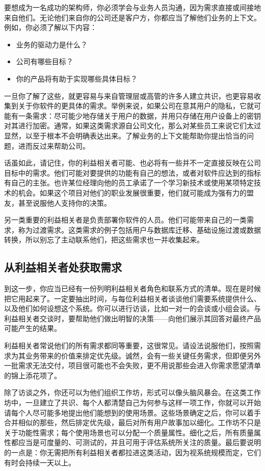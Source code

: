 \label{idx:167}
要想成为一名成功的架构师，你必须学会与业务人员沟通，因为需求直接或间接地来自他们。无论他们来自你的公司还是客户方，你都应当了解他们业务的上下文。例如，你必须了解以下内容：

\begin{itemize}
\item 业务的驱动力是什么？
\item 公司有哪些目标？
\item 你的产品将有助于实现哪些具体目标？
\end{itemize}

一旦你了解了这些，就更容易与来自管理层或高管的许多人建立共识，也更容易收集到关于你软件的更具体的需求。举例来说，如果公司在意其用户的隐私，它就可能有一条需求：尽可能少地存储关于用户的数据，并用只存储在用户设备上的密钥对其进行加密。通常，如果这类需求源自公司文化，那么对某些员工来说它们太过显然，以至于根本不会明确表达出来。了解业务的上下文能帮助你提出恰当的问题，进而反过来帮助公司。

话虽如此，请记住，你的利益相关者可能、也必将有一些并不一定直接反映在公司目标中的需求。他们可能对要提供的功能有自己的想法，或者对软件应达到的指标有自己的主张。也许某位经理向他的员工承诺了一个学习新技术或使用某项特定技术的机会。如果这个项目对他们的职业发展很重要，他们就可能成为强有力的盟友，甚至说服他人支持你的决策。

另一类重要的利益相关者是负责部署你软件的人员。他们可能带来自己的一类需求，称为过渡需求。这类需求的例子包括用户与数据库迁移、基础设施过渡或数据转换，所以别忘了主动联系他们，把这些需求也一并收集起来。

\subsection{从利益相关者处获取需求}

\label{idx:168}
到这一步，你应当已经有一份列明利益相关者角色和联系方式的清单。现在是时候把它用起来了。一定要抽出时间，与每位利益相关者谈谈他们需要系统提供什么、以及他们如何设想这个系统。你可以进行访谈，比如一对一的会谈或小组会谈。与利益相关者交谈时，要帮助他们做出明智的决策——向他们展示其回答对最终产品可能产生的结果。

利益相关者常说他们的所有需求都同等重要，这很常见。请设法说服他们，按照需求为其业务带来的价值来排定优先级。诚然，会有一些关键任务需求，但即便另外一批需求无法交付，项目很可能也不会失败，更不用说那些会进入你需求愿望清单的锦上添花项了。

\label{idx:169}
除了访谈之外，你还可以为他们组织工作坊，形式可以像头脑风暴会。在这类工作坊中，一旦建立了共识、每个人都清楚自己为何参与这样一项工作，你就可以开始请每个人尽可能多地提出他们能想到的使用场景。这些场景确定之后，你可以着手合并相似的那些，然后排定优先级，最后对所有用户故事加以细化。工作坊不只是关于功能性需求；每个使用场景也可以分配一个质量属性。细化之后，所有质量属性都应当是可度量的、可测试的，并且可用于评估系统所关注的质量。最后要说明的一点是：你无需把所有利益相关者都拉进这类活动，因为视系统规模而定，它们有时会持续一天以上。

